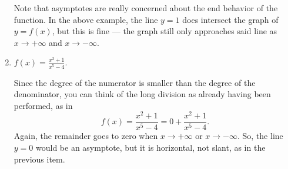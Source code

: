 \documentclass{ximera}
\begin{document}
\begin{example}
\begin{enumerate}
\begin{explanation}
      Note that asymptotes are really concerned about the end behavior of the function. In the above example, the line $y=1$ does intersect the graph of $y=f(x)$, but this is fine --- the graph still only approaches said line as $x \to +\infty$ and $x \to -\infty$.
   \end{explanation}
  \item $f(x) = \frac{x^2+1}{x^5-4}$. \\[1em]
    \begin{explanation}
      Since the degree of the numerator is smaller than the degree of the denominator, you can think of the long division as already having been performed, as in \[ f(x) = \frac{x^2+1}{x^5-4} = 0 + \frac{x^2+1}{x^5-4}.  \]Again, the remainder goes to zero when $x \to +\infty$ or $x\to -\infty$. So, the line $y=0$ would be an asymptote, but it is horizontal, not slant, as in the previous item.

  \begin{image}
 \end{image}

      
    \end{explanation}
  \end{enumerate}

\end{example}
\end{document}
